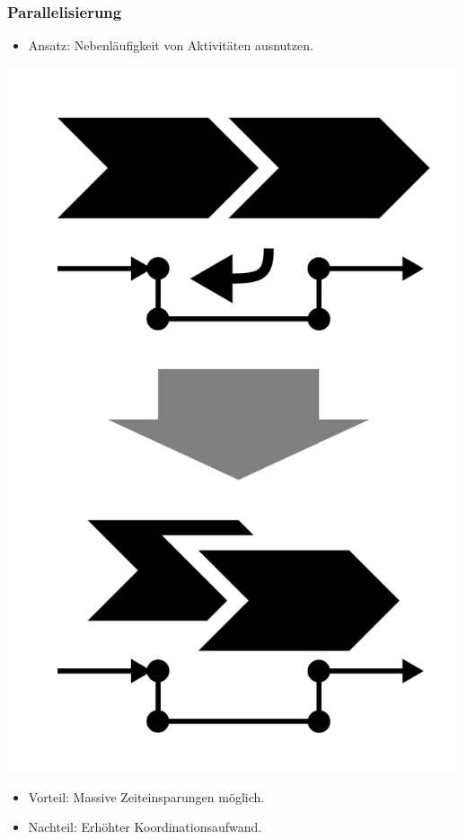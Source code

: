 \documentclass[xcolor=dvipsnames]{beamer}
\begin{document}
 \begin{frame}
  \frametitle{Parallelisierung}
   \begin{itemize}
    \item Ansatz: Nebenläufigkeit von Aktivitäten ausnutzen.
   \end{itemize}
  \centerline{\includegraphics[scale=2.5]{4_6_7.png}}
  \begin{itemize}
    \item Vorteil: Massive Zeiteinsparungen möglich.
    \item Nachteil: Erhöhter Koordinationsaufwand.
  \end{itemize}
 \end{frame}
\end{document}
